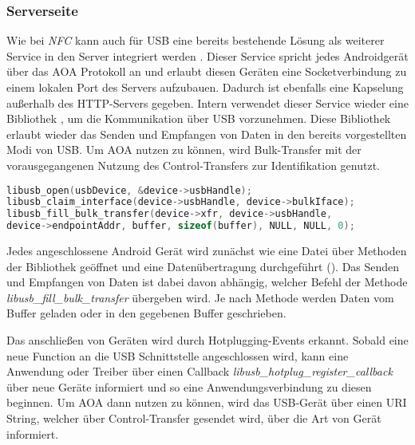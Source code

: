     \subsubsection{Serverseite}
        Wie bei {\it NFC} kann auch für USB eine bereits bestehende Lösung als weiterer Service in den Server integriert werden \cite{aoaProxyAccessory}. Dieser Service spricht jedes Androidgerät über das AOA Protokoll an und erlaubt diesen Geräten eine Socketverbindung zu einem lokalen Port des Servers aufzubauen. Dadurch ist ebenfalls eine Kapselung außerhalb des HTTP-Servers gegeben. Intern verwendet dieser Service wieder eine Bibliothek \cite{libusb}, um die Kommunikation über USB vorzunehmen. Diese Bibliothek erlaubt wieder das Senden und Empfangen von Daten in den bereits vorgestellten Modi von USB. Um AOA nutzen zu können, wird Bulk-Transfer mit der vorausgegangenen Nutzung des Control-Transfers zur Identifikation genutzt.
        \pagebreak
        \begin{lstlisting}[frame=bt, label={lst:usb:server}, language=C, caption=Verbindungsaufbau über USB (Servercode in C) \cite{aoaProxyAccessory}]
libusb_open(usbDevice, &device->usbHandle);
libusb_claim_interface(device->usbHandle, device->bulkIface);
libusb_fill_bulk_transfer(device->xfr, device->usbHandle,
device->endpointAddr, buffer, sizeof(buffer), NULL, NULL, 0);
        \end{lstlisting}
        
        Jedes angeschlossene Android Gerät wird zunächst wie eine Datei über Methoden der Bibliothek geöffnet und eine Datenübertragung durchgeführt (). Das Senden und Empfangen von Daten ist dabei davon abhängig, welcher Befehl der Methode {\it libusb\_fill\_bulk\_transfer} übergeben wird. Je nach Methode werden Daten vom Buffer geladen oder in den gegebenen Buffer geschrieben.
        
        Das anschließen von Geräten wird durch Hotplugging-Events erkannt. Sobald eine neue Function an die USB Schnittstelle angeschlossen wird, kann eine Anwendung oder Treiber über einen Callback {\it libusb\_hotplug\_register\_callback} über neue Geräte informiert und so eine Anwendungsverbindung zu diesen beginnen. Um AOA dann nutzen zu können, wird das USB-Gerät über einen URI String, welcher über Control-Transfer gesendet wird, über die Art von Gerät informiert.

